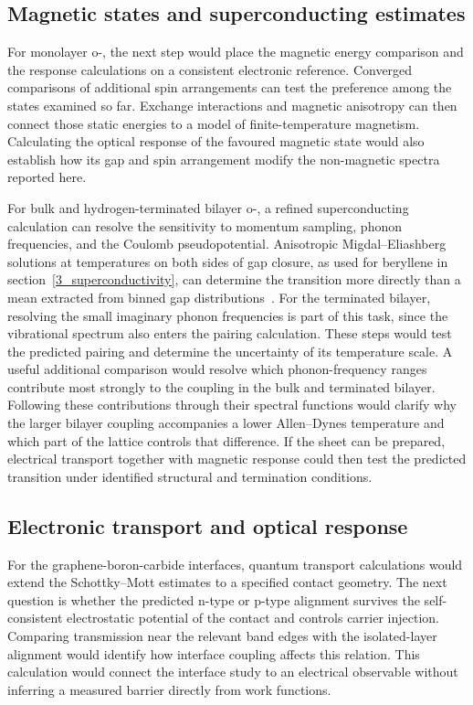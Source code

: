 \subsection{Magnetic states and superconducting estimates}

For monolayer o-, the next step would place the magnetic energy comparison and the response calculations on a consistent electronic reference.
Converged comparisons of additional spin arrangements can test the preference among the states examined so far.
Exchange interactions and magnetic anisotropy can then connect those static energies to a model of finite-temperature magnetism.
Calculating the optical response of the favoured magnetic state would also establish how its gap and spin arrangement modify the non-magnetic spectra reported here.

For bulk and hydrogen-terminated bilayer o-, a refined superconducting calculation can resolve the sensitivity to momentum sampling, phonon frequencies, and the Coulomb pseudopotential.
Anisotropic Migdal--Eliashberg solutions at temperatures on both sides of gap closure, as used for beryllene in section~\ref{3_superconductivity}, can determine the transition more directly than a mean extracted from binned gap distributions~\cite{margine2013anisotropic}.
For the terminated bilayer, resolving the small imaginary phonon frequencies is part of this task, since the vibrational spectrum also enters the pairing calculation.
These steps would test the predicted pairing and determine the uncertainty of its temperature scale.
A useful additional comparison would resolve which phonon-frequency ranges contribute most strongly to the coupling in the bulk and terminated bilayer.
Following these contributions through their spectral functions would clarify why the larger bilayer coupling accompanies a lower Allen--Dynes temperature and which part of the lattice controls that difference.
If the sheet can be prepared, electrical transport together with magnetic response could then test the predicted transition under identified structural and termination conditions.

\subsection{Electronic transport and optical response}

For the graphene-boron-carbide interfaces, quantum transport calculations would extend the Schottky--Mott estimates to a specified contact geometry.
The next question is whether the predicted n-type or p-type alignment survives the self-consistent electrostatic potential of the contact and controls carrier injection.
Comparing transmission near the relevant band edges with the isolated-layer alignment would identify how interface coupling affects this relation.
This calculation would connect the interface study to an electrical observable without inferring a measured barrier directly from work functions.

